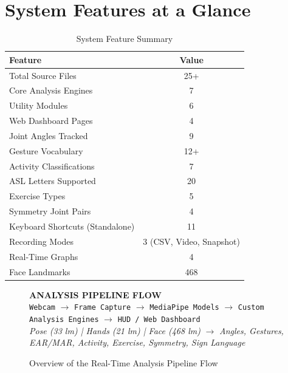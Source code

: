 \documentclass[a4paper,12pt]{report}
\begin{document}
\section{System Features at a Glance}
\begin{table}[H]
\centering
\begin{tabular}{|l|c|}
\hline
\textbf{Feature} & \textbf{Value} \\
\hline
Total Source Files & 25+ \\
Core Analysis Engines & 7 \\
Utility Modules & 6 \\
Web Dashboard Pages & 4 \\
Joint Angles Tracked & 9 \\
Gesture Vocabulary & 12+ \\
Activity Classifications & 7 \\
ASL Letters Supported & 20 \\
Exercise Types & 5 \\
Symmetry Joint Pairs & 4 \\
Keyboard Shortcuts (Standalone) & 11 \\
Recording Modes & 3 (CSV, Video, Snapshot) \\
Real-Time Graphs & 4 \\
Face Landmarks & 468 \\
\hline
\end{tabular}
\caption{System Feature Summary}
\label{tab:features}
\end{table}

\begin{figure}[H]
    \centering
    \begin{tcolorbox}[colback=blue!5, colframe=blue!40, width=0.95\textwidth, height=6cm]
        \centering
        \vfill
        \textbf{ANALYSIS PIPELINE FLOW}\\[0.6cm]
        \texttt{Webcam} $\rightarrow$ \texttt{Frame Capture} $\rightarrow$ \texttt{MediaPipe Models} $\rightarrow$ \texttt{Custom Analysis Engines} $\rightarrow$ \texttt{HUD / Web Dashboard}\\[0.4cm]
        \small
        \textit{Pose (33 lm) | Hands (21 lm) | Face (468 lm)} $\rightarrow$ \textit{Angles, Gestures, EAR/MAR, Activity, Exercise, Symmetry, Sign Language}
        \vfill
    \end{tcolorbox}
    \caption{Overview of the Real-Time Analysis Pipeline Flow}
    \label{fig:pipeline_flow}
\end{figure}
\end{document}
